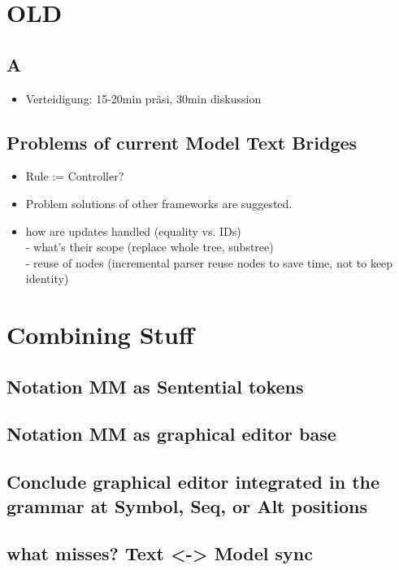 \chapter{OLD}
\section{A}
\begin{itemize}
	\item Verteidigung: 15-20min präsi, 30min diskussion
\end{itemize}
	

\section{Problems of current Model Text Bridges}
\begin{itemize}
	\item Rule := Controller?
	\item Problem solutions of other frameworks are suggested.
\item how are updates handled (equality vs. IDs) \\
		- what's their scope (replace whole tree, substree) \\
		-	reuse of nodes (incremental parser reuse nodes to save time, not to keep identity)
\end{itemize}	




\chapter{Combining Stuff}
\section{Notation MM as Sentential tokens}
\section{Notation MM as graphical editor base}
\section{Conclude graphical editor integrated in the grammar at Symbol, Seq, or Alt positions}
\section{what misses? Text <-> Model sync}






